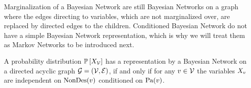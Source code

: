 Marginalization of a Bayesian Network are still Bayesian Networks on a graph where the edges directing to variables, which are not marginalized over, are replaced by directed edges to the children.
Conditioned Bayesian Network do not have a simple Bayesian Network representation, which is why we will treat them as Markov Networks to be introduced next.


\begin{theorem}\label{the:condIndBN}
	A probability distribution $\mathbb{P}\left[X_{\mathcal{V}}\right]$ has a representation by a Bayesian Network on a directed acyclic graph $\mathcal{G}=(\mathcal{V},\mathcal{E})$, if and only if for any $v\in\mathcal{V}$ the variables $X_{v}$ are independent on $\mathrm{NonDes}(v)$ conditioned on $\mathrm{Pa}(v)$.
\end{theorem}
